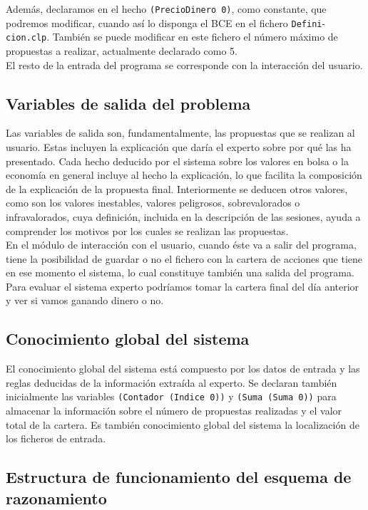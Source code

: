 \documentclass[11pt,leqno]{article}
\theoremstyle{definition_wo_parentheses}
\theoremstyle{plain}
\theoremstyle{remark}
\begin{document}
	Además, declaramos en el hecho \texttt{(PrecioDinero 0)}, como constante, que podremos modificar, cuando así lo disponga el BCE en el fichero \texttt{Defini}-\texttt{cion.clp}. También se puede modificar en este fichero el número máximo de propuestas a realizar, actualmente declarado como 5.\\
	El resto de la entrada del programa se corresponde con la interacción del usuario.
	
\subsection{Variables de salida del problema}
	
	Las variables de salida son, fundamentalmente, las propuestas que se realizan al usuario. Estas incluyen la explicación que daría el experto sobre por qué las ha presentado. Cada hecho deducido por el sistema sobre los valores en bolsa o la economía en general incluye al hecho la explicación, lo que facilita la composición de la explicación de la propuesta final. Interiormente se deducen otros valores, como son los valores inestables, valores peligrosos, sobrevalorados o infravalorados, cuya definición,  incluida en la descripción de las sesiones, ayuda a comprender los motivos por los cuales se realizan las propuestas.\\
	En el módulo de interacción con el usuario, cuando éste va a salir del programa, tiene la posibilidad de guardar o no el fichero con la cartera de acciones que tiene en ese momento el sistema, lo cual constituye también una salida del programa. Para evaluar el sistema experto podríamos tomar la cartera final del día anterior y ver si vamos ganando dinero o no.
	
\subsection{Conocimiento global del sistema}

	El conocimiento global del sistema está compuesto por los datos de entrada y las reglas deducidas de la información extraída al experto. Se declaran también inicialmente las variables \texttt{(Contador (Indice 0))} y \texttt{(Suma (Suma 0))} para almacenar la información sobre el número de propuestas realizadas y el valor total de la cartera. Es también conocimiento global del sistema la localización de los ficheros de entrada.
	
\subsection{Estructura de funcionamiento del esquema de razonamiento}
\end{document}
